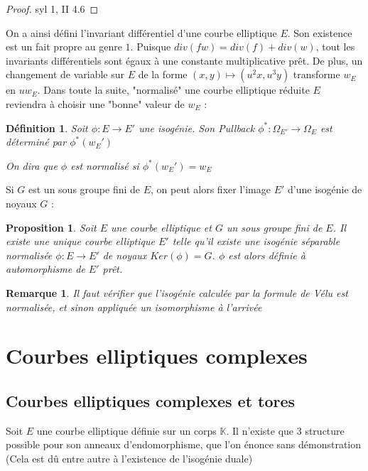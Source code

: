 \documentclass{article}
\newcommand{\K}[0]{\mathbb{K}}
\newtheorem{Prop}[The]{Proposition}
\newtheorem{Def}[The]{Définition}
\newtheorem{Rem}[The]{Remarque}
\begin{document}
\begin{proof}
	syl 1, II 4.6
\end{proof}

On a ainsi défini l'invariant différentiel d'une courbe elliptique $E$. Son existence est un fait propre au genre $1$. Puisque $div(fw) = div(f) + div(w)$, tout les invariants différentiels sont égaux à une constante multiplicative prêt. De plus, un changement de variable sur $E$ de la forme $(x,y)\mapsto(u^{2}x,u^{3}y)$ transforme $w_E$ en $uw_E$. Dans toute la suite, "normalisé" une courbe elliptique réduite $E$ reviendra à choisir une "bonne" valeur de $w_E$ :

\begin{Def}
	
	Soit $\phi : E\rightarrow E'$ une isogénie. Son Pullback $\phi^{*} : \Omega_{E'} \rightarrow \Omega_{E}$ est déterminé par $\phi^{*}(w_E')$
	
	On dira que $\phi$ est normalisé si $\phi^{*}(w_E') = w_E$
	
\end{Def}

Si $G$ est un sous groupe fini de $E$, on peut alors fixer l'image $E'$ d'une isogénie de noyaux $G$ :

\begin{Prop}
	Soit $E$ une courbe elliptique et $G$ un sous groupe fini de $E$. Il existe une unique courbe elliptique $E'$ telle qu'il existe une isogénie séparable normalisée $\phi : E \rightarrow E'$ de noyaux $Ker(\phi) = G$. $\phi$ est alors définie à automorphisme de $E'$ prêt.
\end{Prop}

\begin{Rem}
	Il faut vérifier que l'isogénie calculée par la formule de Vélu est normalisée, et sinon appliquée un isomorphisme à l'arrivée
\end{Rem}




\section{Courbes elliptiques complexes}





\subsection{Courbes elliptiques complexes et tores}

Soit $E$ une courbe elliptique définie sur un corps $\K$. Il n'existe que $3$ structure possible pour son anneaux d'endomorphisme, que l'on énonce sans démonstration (Cela est dû entre autre à l'existence de l'isogénie duale)
\end{document}
